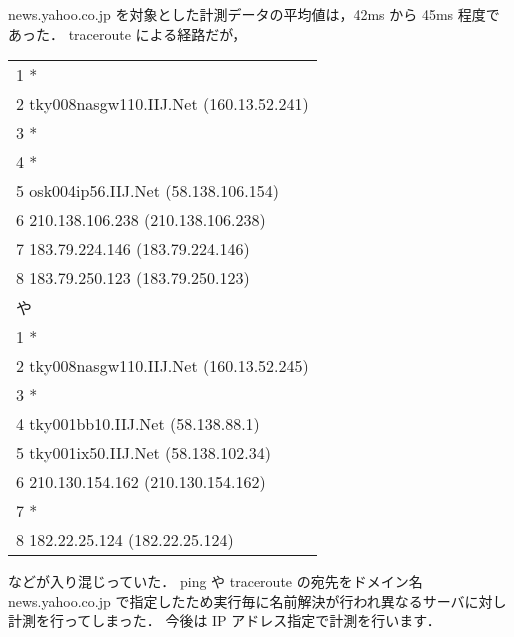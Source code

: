 \documentclass[a4j]{jarticle}
\begin{document}
news.yahoo.co.jp を対象とした計測データの平均値は，42ms から 45ms 程度であった．
traceroute による経路だが，
\begin{table}[H]
\centering
\begin{tabular}{l}
 1  *\\
 2  tky008nasgw110.IIJ.Net (160.13.52.241)\\
 3  *\\
 4  *\\
 5  osk004ip56.IIJ.Net (58.138.106.154)\\
 6  210.138.106.238 (210.138.106.238)\\
 7  183.79.224.146 (183.79.224.146)\\
 8  183.79.250.123 (183.79.250.123)\\
や\\
 1  *\\
 2  tky008nasgw110.IIJ.Net (160.13.52.245)\\
 3  *\\
 4  tky001bb10.IIJ.Net (58.138.88.1)\\
 5  tky001ix50.IIJ.Net (58.138.102.34)\\
 6  210.130.154.162 (210.130.154.162)\\
 7  *\\
 8  182.22.25.124 (182.22.25.124)\\
\end{tabular}
\end{table}
などが入り混じっていた．
ping や traceroute の宛先をドメイン名 news.yahoo.co.jp で指定したため実行毎に名前解決が行われ異なるサーバに対し計測を行ってしまった．
今後は IP アドレス指定で計測を行います．
 
\end{document}
